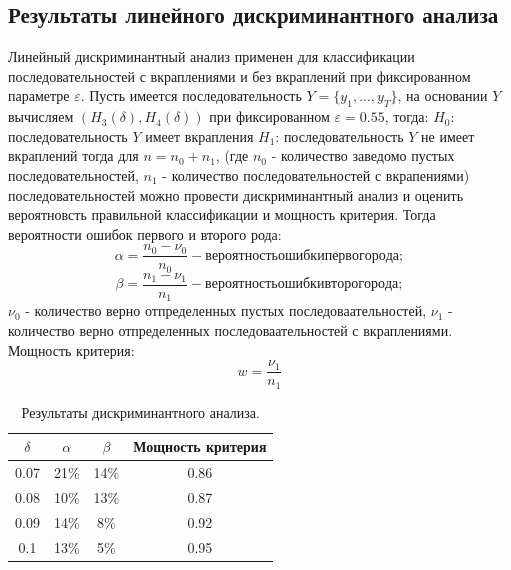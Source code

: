 \documentclass[a4paper,12pt]{article}
\theoremstyle{plain}
\begin{document}
\subsection{Результаты линейного дискриминантного анализа}
Линейный дискриминантный анализ применен для классификации последовательностей с вкраплениями и без вкраплений при фиксированном параметре $\varepsilon$.\newline
Пусть имеется последовательность $Y=\{y_1,...,y_T\}$, на основании $Y$ вычисляем $(H_3(\delta), H_4(\delta))$ при фиксированном $\varepsilon=0.55$, тогда:\newline
$H_0$: последовательность $Y$ имеет вкрапления\newline
$H_1$: последовательность $Y$ не имеет вкраплений\newline
тогда для $n=n_0+n_1$, (где $n_0$ - количество заведомо пустых последовательностей, $n_1$ - количество последовательностей с вкрапениями) последовательностей можно провести дискриминантный анализ и оценить вероятновсть правильной классификации и мощность критерия. \newline
Тогда вероятности ошибок первого и второго рода:
\begin{equation}
\alpha = \frac{n_0-\nu_0}{n_0} - вероятность ошибки первого рода;
\end{equation}
\begin{equation}
\beta = \frac{n_1-\nu_1}{n_1} - вероятность ошибки второго рода;
\end{equation}
$\nu_0$ - количество верно отпределенных пустых последоваательностей,
$\nu_1$ - количество верно отпределенных последоваательностей с вкраплениями.\newline
Мощность критерия:
\begin{equation}
w = \frac{\nu_1}{n_1} 
\end{equation}



\begin{table} [h] 	
	\begin{center}
		\begin{tabular}{|c|c|c|c|}
			\hline
			$\delta$ &  $\alpha$ &  $\beta$ & Мощность критерия \\
			\hline
			0.07 & 21\% & 14\% & 0.86\\  		
			\hline
			0.08 & 10\% & 13\% & 0.87\\  		
			\hline
			0.09 & 14\% & 8\% & 0.92\\  		
			\hline
			0.1 & 13\% & 5\% & 0.95\\  		
			\hline			
		\end{tabular}
	\end{center}
	\caption{\label{tab:canonsummary}Результаты дискриминантного анализа.}
\end{table} 
\end{document}
